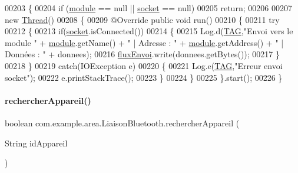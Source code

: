\begin{DoxyCode}
00203     \{
00204         \textcolor{keywordflow}{if} (\hyperlink{classcom_1_1example_1_1area_1_1_liaison_bluetooth_a80068a7178f6c84eae7bab50cf0a784a}{module} == null || \hyperlink{classcom_1_1example_1_1area_1_1_liaison_bluetooth_ab59b57f5e59d0236e49ecf68c053cb27}{socket} == null)
00205             \textcolor{keywordflow}{return};
00206 
00207         \textcolor{keyword}{new} \hyperlink{class_thread}{Thread}()
00208         \{
00209             @Override \textcolor{keyword}{public} \textcolor{keywordtype}{void} run()
00210             \{
00211                 \textcolor{keywordflow}{try}
00212                 \{
00213                     \textcolor{keywordflow}{if}(\hyperlink{classcom_1_1example_1_1area_1_1_liaison_bluetooth_ab59b57f5e59d0236e49ecf68c053cb27}{socket}.isConnected())
00214                     \{
00215                         Log.d(\hyperlink{classcom_1_1example_1_1area_1_1_liaison_bluetooth_ac51aa4b63fae5c36734a061cc05d7fc9}{TAG},\textcolor{stringliteral}{"Envoi vers le module "} + \hyperlink{classcom_1_1example_1_1area_1_1_liaison_bluetooth_a80068a7178f6c84eae7bab50cf0a784a}{module}.getName() + \textcolor{stringliteral}{" | Adresse : "} + 
      \hyperlink{classcom_1_1example_1_1area_1_1_liaison_bluetooth_a80068a7178f6c84eae7bab50cf0a784a}{module}.getAddress() + \textcolor{stringliteral}{" | Données : "} + donnees);
00216                         \hyperlink{classcom_1_1example_1_1area_1_1_liaison_bluetooth_ab6b076591203cae95fde933717019c5d}{fluxEnvoi}.write(donnees.getBytes());
00217                     \}
00218                 \}
00219                 \textcolor{keywordflow}{catch}(IOException e)
00220                 \{
00221                     Log.e(\hyperlink{classcom_1_1example_1_1area_1_1_liaison_bluetooth_ac51aa4b63fae5c36734a061cc05d7fc9}{TAG},\textcolor{stringliteral}{"Erreur envoi socket"});
00222                     e.printStackTrace();
00223                 \}
00224             \}
00225         \}.start();
00226     \}
\end{DoxyCode}
\mbox{\label{classcom_1_1example_1_1area_1_1_liaison_bluetooth_a47786b43e054a81e08356cd22b4cb37e}} 
\paragraph{\texorpdfstring{rechercher\+Appareil()}{rechercherAppareil()}}
{\footnotesize\ttfamily boolean com.\+example.\+area.\+Liaison\+Bluetooth.\+rechercher\+Appareil (\begin{DoxyParamCaption}\item[{String}]{id\+Appareil }\end{DoxyParamCaption})\hspace{0.3cm}{\ttfamily [private]}}



